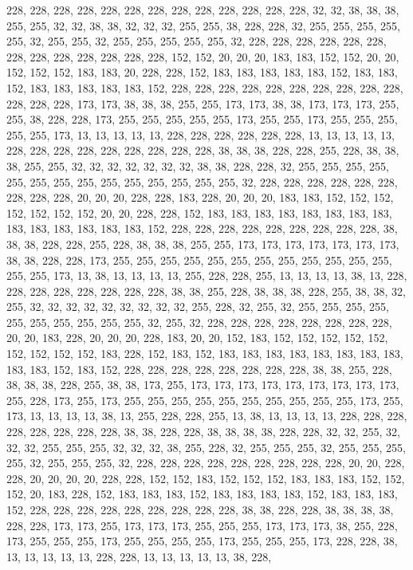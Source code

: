{	228, 228, 228, 228, 228, 228, 228, 228, 228, 228, 228, 228, 228, 32,  32,  38,  38,  38,  255, 255, 32,  32,  38,  38,  32,  32,  32,  255, 255, 38,  228, 228, 32,  255, 255, 255, 255, 255, 32,  255, 255, 32,  255, 255, 255, 255, 255, 32,  228, 228, 228, 228, 228, 228, 228, 228, 228, 228, 228, 228, 228, 152, 152, 20,  20,  20,  183, 183, 152, 152, 20,  20,  152, 152, 152, 183, 183, 20,  228, 228, 152, 183, 183, 183, 183, 183, 152, 183, 183, 152, 183, 183, 183, 183, 183, 152, 228, 228, 228, 228, 228, 228, 228, 228, 228, 228, 228, 228, 228, 173, 173, 38,  38,  38,  255, 255, 173, 173, 38,  38,  173, 173, 173, 255, 255, 38,  228, 228, 173, 255, 255, 255, 255, 255, 173, 255, 255, 173, 255, 255, 255, 255, 255, 173, 13,  13,  13,  13,  13,  228, 228, 228, 228, 228, 228, 13,  13,  13,  13,  13,  
	228, 228, 228, 228, 228, 228, 228, 228, 228, 38,  38,  38,  228, 228, 255, 228, 38,  38,  38,  255, 255, 32,  32,  32,  32,  32,  32,  32,  38,  38,  228, 228, 32,  255, 255, 255, 255, 255, 255, 255, 255, 255, 255, 255, 255, 255, 255, 32,  228, 228, 228, 228, 228, 228, 228, 228, 228, 20,  20,  20,  228, 228, 183, 228, 20,  20,  20,  183, 183, 152, 152, 152, 152, 152, 152, 152, 20,  20,  228, 228, 152, 183, 183, 183, 183, 183, 183, 183, 183, 183, 183, 183, 183, 183, 183, 152, 228, 228, 228, 228, 228, 228, 228, 228, 228, 38,  38,  38,  228, 228, 255, 228, 38,  38,  38,  255, 255, 173, 173, 173, 173, 173, 173, 173, 38,  38,  228, 228, 173, 255, 255, 255, 255, 255, 255, 255, 255, 255, 255, 255, 255, 255, 255, 173, 13,  38,  13,  13,  13,  13,  255, 228, 228, 255, 13,  13,  13,  13,  38,  13,  
	228, 228, 228, 228, 228, 228, 228, 228, 38,  38,  255, 228, 38,  38,  38,  228, 255, 38,  38,  32,  255, 32,  32,  32,  32,  32,  32,  32,  32,  32,  255, 228, 32,  255, 32,  255, 255, 255, 255, 255, 255, 255, 255, 255, 255, 32,  255, 32,  228, 228, 228, 228, 228, 228, 228, 228, 20,  20,  183, 228, 20,  20,  20,  228, 183, 20,  20,  152, 183, 152, 152, 152, 152, 152, 152, 152, 152, 152, 183, 228, 152, 183, 152, 183, 183, 183, 183, 183, 183, 183, 183, 183, 183, 152, 183, 152, 228, 228, 228, 228, 228, 228, 228, 228, 38,  38,  255, 228, 38,  38,  38,  228, 255, 38,  38,  173, 255, 173, 173, 173, 173, 173, 173, 173, 173, 173, 255, 228, 173, 255, 173, 255, 255, 255, 255, 255, 255, 255, 255, 255, 255, 173, 255, 173, 13,  13,  13,  13,  38,  13,  255, 228, 228, 255, 13,  38,  13,  13,  13,  13,  
	228, 228, 228, 228, 228, 228, 228, 228, 38,  38,  228, 228, 38,  38,  38,  38,  228, 228, 32,  32,  255, 32,  32,  32,  255, 255, 255, 32,  32,  32,  38,  255, 228, 32,  255, 255, 255, 32,  255, 255, 255, 255, 32,  255, 255, 255, 32,  228, 228, 228, 228, 228, 228, 228, 228, 228, 20,  20,  228, 228, 20,  20,  20,  20,  228, 228, 152, 152, 183, 152, 152, 152, 183, 183, 183, 152, 152, 152, 20,  183, 228, 152, 183, 183, 183, 152, 183, 183, 183, 183, 152, 183, 183, 183, 152, 228, 228, 228, 228, 228, 228, 228, 228, 228, 38,  38,  228, 228, 38,  38,  38,  38,  228, 228, 173, 173, 255, 173, 173, 173, 255, 255, 255, 173, 173, 173, 38,  255, 228, 173, 255, 255, 255, 173, 255, 255, 255, 255, 173, 255, 255, 255, 173, 228, 228, 38,  13,  13,  13,  13,  13,  228, 228, 13,  13,  13,  13,  13,  38,  228, 
}
